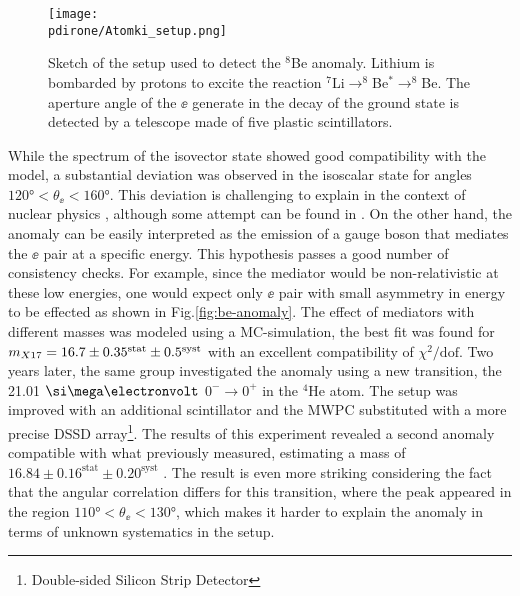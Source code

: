 \begin{figure}[htb!]
  \centering
  \texttt{[image: \\pdirone/Atomki\_setup.png]}
  \caption[Sketch of the setup used to detect the $^8$Be anomaly.]{Sketch of the setup used to detect the $^8$Be anomaly. Lithium is bombarded by protons to excite the reaction $^7$Li$\to ^8$Be$^* \to ^8$Be. The aperture angle of the $\ee$ generate in the decay of the ground state is detected by a telescope made of five plastic scintillators. \cite{PhysRevD.95.035017}}
  \label{fig:x17-setup}
\end{figure}

While the spectrum of the isovector state showed good compatibility with the model, a substantial deviation was observed in the isoscalar state for angles $120 \si{\degree} < \theta_{\ee} < 160 \si{\degree}$. This deviation is challenging to explain in the context of nuclear physics \cite{Krasznahorkay:2015iga}, although some attempt can be found in \cite{Zhang:2017zap,Koch:2020ouk}. On the other hand, the anomaly can be easily interpreted as the emission of a gauge boson that mediates the $\ee$ pair at a specific energy. This hypothesis passes a good number of consistency checks. For example, since the mediator would be non-relativistic at these low energies, one would expect only $\ee$ pair with small asymmetry in energy to be effected as shown in Fig.\ref{fig:be-anomaly}. The effect of mediators with different masses was modeled using a MC-simulation, the best fit was found for $m_{X17} = 16.7 \pm 0.35^{\textrm{stat}} \pm 0.5^{\textrm{syst}}$ with an excellent compatibility of $\chi^2/\textrm{dof}$. Two years later, the same group investigated the anomaly using a new transition, the 21.01 $\mev$ $0^- \to 0^+$ in the $^4$He atom. The setup was improved with an additional scintillator and the MWPC substituted with a more precise  DSSD array\footnote{Double-sided Silicon Strip Detector}. The results of this experiment revealed a second anomaly compatible with what previously measured, estimating a mass of $16.84 \pm 0.16^{\textrm{stat}} \pm 0.20^{\textrm{syst}}$ \cite{Krasznahorkay:2019lyl}. The result is even more striking considering the fact that the angular correlation differs for this transition, where the peak appeared in the region $110 \si{\degree} < \theta_{\ee} < 130 \si{\degree}$, which makes it harder to explain the anomaly in terms of unknown systematics in the setup.

